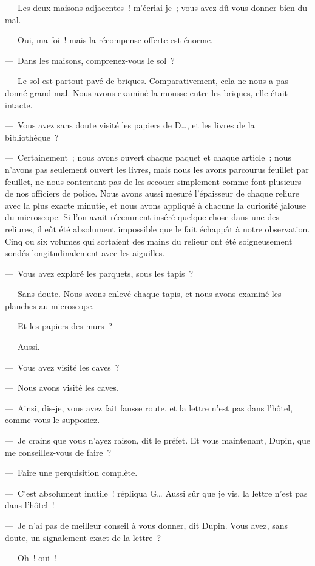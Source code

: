 \documentclass[french,twoside]{book} %
\begin{document}
— Les deux maisons adjacentes ! m’écriai-je ; vous avez dû vous donner bien du mal.\par
— Oui, ma foi ! mais la récompense offerte est énorme.\par
— Dans les maisons, comprenez-vous le sol ?\par
— Le sol est partout pavé de briques. Comparativement, cela ne nous a pas donné grand mal. Nous avons examiné la mousse entre les briques, elle était intacte.\par
— Vous avez sans doute visité les papiers de D…, et les livres de la bibliothèque ?\par
— Certainement ; nous avons ouvert chaque paquet et chaque article ; nous n’avons pas seulement ouvert les livres, mais nous les avons parcourus feuillet par feuillet, ne nous contentant pas de les secouer simplement comme font plusieurs de nos officiers de police. Nous avons aussi mesuré l’épaisseur de chaque reliure avec la plus exacte minutie, et nous avons appliqué à chacune la curiosité jalouse du microscope. Si l’on avait récemment inséré quelque chose dans une des reliures, il eût été absolument impossible que le fait échappât à notre observation. Cinq ou six volumes qui sortaient des mains du relieur ont été soigneusement sondés longitudinalement avec les aiguilles.\par
— Vous avez exploré les parquets, sous les tapis ?\par
— Sans doute. Nous avons enlevé chaque tapis, et nous avons examiné les planches au microscope.\par
— Et les papiers des murs ?\par
— Aussi.\par
— Vous avez visité les caves ?\par
— Nous avons visité les caves.\par
— Ainsi, dis-je, vous avez fait fausse route, et la lettre n’est pas dans l’hôtel, comme vous le supposiez.\par
— Je crains que vous n’ayez raison, dit le préfet. Et vous maintenant, Dupin, que me conseillez-vous de faire ?\par
— Faire une perquisition complète.\par
— C’est absolument inutile ! répliqua G… Aussi sûr que je vis, la lettre n’est pas dans l’hôtel !\par
— Je n’ai pas de meilleur conseil à vous donner, dit Dupin. Vous avez, sans doute, un signalement exact de la lettre ?\par
— Oh ! oui !\par
\end{document}
